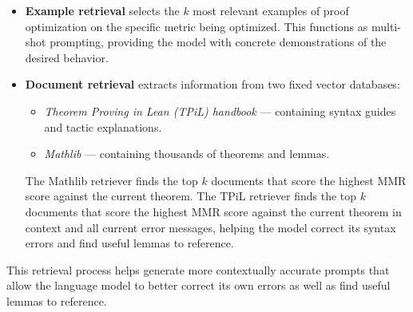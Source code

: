 \begin{itemize}
    \item \textbf{Example retrieval} selects the $k$ most relevant examples of proof optimization on the specific metric being optimized. This functions as multi-shot prompting, providing the model with concrete demonstrations of the desired behavior.
    \item \textbf{Document retrieval} extracts information from two fixed vector databases:
    \begin{itemize}
        \item \textit{Theorem Proving in Lean (TPiL) handbook} \cite{avigad2024tpil} --- containing syntax guides and tactic explanations.
        \item \textit{Mathlib} \cite{The_mathlib_Community_2020} --- containing thousands of theorems and lemmas.
    \end{itemize}
    The Mathlib retriever finds the top $k$ documents that score the highest MMR score against the current theorem. The TPiL retriever finds the top $k$ documents that score the highest MMR score against the current theorem in context and all current error messages, helping the model correct its syntax errors and find useful lemmas to reference.
\end{itemize}

This retrieval process helps generate more contextually accurate prompts that allow the language model to better correct its own errors as well as find useful lemmas to reference.
